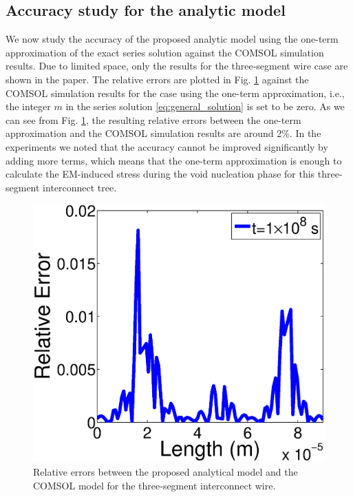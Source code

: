 \subsection{Accuracy study for the analytic model}
We now study the accuracy of the proposed analytic model using the one-term approximation of the exact series solution against the COMSOL simulation results. 
Due to limited space, only the results for the three-segment wire case are shown in the paper. The relative errors are plotted in Fig. \ref{fig:TimeError1e8} against the COMSOL simulation results for the case using the one-term approximation, i.e., the integer $m$ in the series solution \eqref{eq:general_solution} is set to be zero. As we can see from Fig. \ref{fig:TimeError1e8}, the resulting relative errors between the one-term approximation and the COMSOL simulation results are around 2\%. In the experiments we noted that the accuracy cannot be improved significantly by adding more terms, which means that the one-term approximation is enough to calculate the EM-induced stress during the void nucleation phase for this three-segment interconnect tree.
\begin{figure}[!h]
\centering
\includegraphics[width=0.7\columnwidth]{TimeError1e8.eps}
\caption{Relative errors between the proposed analytical model and the
COMSOL model for the three-segment interconnect wire.}
\label{fig:TimeError1e8}
\end{figure}

